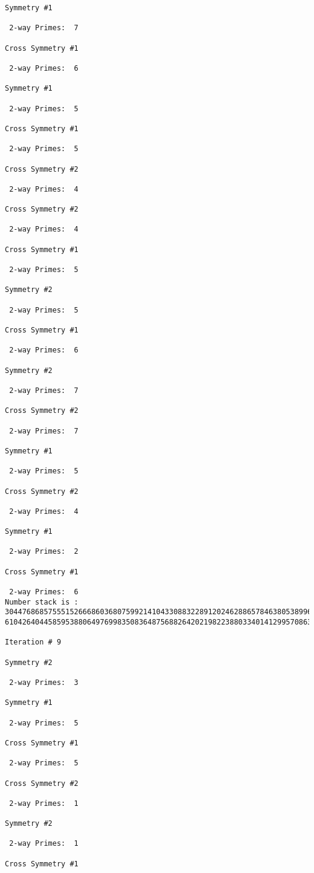 {{{{\begin{verbatim}
Symmetry #1

 2-way Primes: 	7

Cross Symmetry #1

 2-way Primes: 	6

Symmetry #1

 2-way Primes: 	5

Cross Symmetry #1

 2-way Primes: 	5

Cross Symmetry #2

 2-way Primes: 	4

Cross Symmetry #2

 2-way Primes: 	4

Cross Symmetry #1

 2-way Primes: 	5

Symmetry #2

 2-way Primes: 	5

Cross Symmetry #1

 2-way Primes: 	6

Symmetry #2

 2-way Primes: 	7

Cross Symmetry #2

 2-way Primes: 	7

Symmetry #1

 2-way Primes: 	5

Cross Symmetry #2

 2-way Primes: 	4

Symmetry #1

 2-way Primes: 	2

Cross Symmetry #1

 2-way Primes: 	6
Number stack is :
30447686857555152666860368075992141043308832289120246288657846380538996794608835958544046240163340857
61042640445859538806497699835083648756882642021982238803340141299570863068666251555758686744037580433

Iteration #	9

Symmetry #2

 2-way Primes: 	3

Symmetry #1

 2-way Primes: 	5

Cross Symmetry #1

 2-way Primes: 	5

Cross Symmetry #2

 2-way Primes: 	1

Symmetry #2

 2-way Primes: 	1

Cross Symmetry #1


\end{verbatim}}}}}
